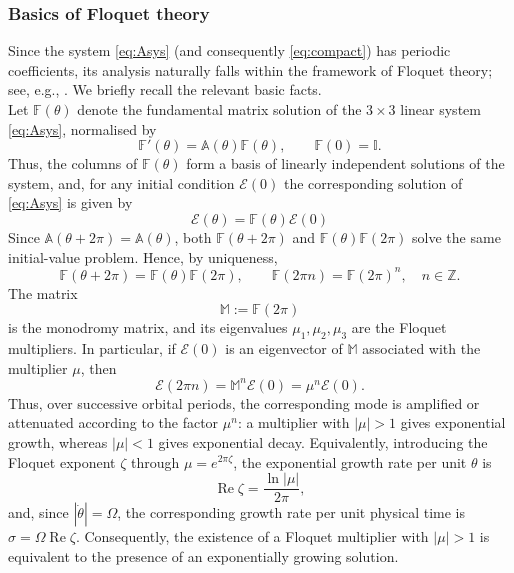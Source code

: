 \documentclass[reqno]{amsart}
\newcommand{\F}{\mathbb{F}}
\begin{document}
\subsubsection{Basics of Floquet theory}
Since the system \eqref{eq:Asys} (and consequently \eqref{eq:compact}) has periodic coefficients, its analysis naturally falls within the framework of Floquet theory; see, e.g., \cite{YakubovichStarzhinskii1975}. We briefly recall the relevant basic facts.\\
\noindent
Let $\F(\theta)$ denote the fundamental matrix solution of the $3\times3$ linear system \eqref{eq:Asys}, normalised by\begin{equation}
\F'(\theta)=\mathbb A(\theta)\F(\theta),
\qquad
\F(0)=\mathbb I.
\end{equation}
Thus, the columns of $\F(\theta)$ form a basis of linearly independent solutions of the system, and, for any initial condition $\boldsymbol{\mathcal{E}}(0)$ the corresponding solution of \eqref{eq:Asys} is given by
\begin{equation}
\boldsymbol{\mathcal{E}}(\theta)=\F(\theta)\boldsymbol{\mathcal{E}}(0)
\end{equation}
Since $\mathbb A(\theta+2\pi)=\mathbb A(\theta)$, both $\F(\theta+2\pi)$ and $\F(\theta)\F(2\pi)$ solve the same initial-value problem. Hence, by uniqueness,
\begin{equation}\label{eq:period}
\F(\theta+2\pi)=\F(\theta)\F(2\pi),
\qquad
\F(2\pi n)=\F(2\pi)^n,
\quad n\in\mathbb Z.
\end{equation}
The matrix
\[
\mathbb M:=\F(2\pi)
\]
is the {monodromy matrix}, and its eigenvalues $\mu_1,\mu_2,\mu_3$ are the {Floquet multipliers}. In particular, if $\boldsymbol{\mathcal E}(0)$ is an eigenvector of $\mathbb M$ associated with the multiplier $\mu$, then
\[
\boldsymbol{\mathcal E}(2\pi n)
=\mathbb M^n\boldsymbol{\mathcal E}(0)
=\mu^n\boldsymbol{\mathcal E}(0).
\]
Thus, over successive orbital periods, the corresponding mode is amplified or attenuated according to the factor $\mu^n$: a multiplier with $|\mu|>1$ gives exponential growth, whereas $|\mu|<1$ gives exponential decay. Equivalently, introducing the {Floquet exponent} $\zeta$ through $\mu=e^{2\pi\zeta}$, the exponential growth rate per unit $\theta$ is
\begin{equation}\label{eq:rate}
\operatorname{Re}\zeta
=\frac{\ln|\mu|}{2\pi},
\end{equation}
and, since $|\dot\theta|=\Omega$, the corresponding growth rate per unit physical time is $\sigma=\Omega\operatorname{Re}\zeta$. Consequently, the existence of a Floquet multiplier with $|\mu|>1$ is equivalent to the presence of an exponentially growing solution.
\end{document}

